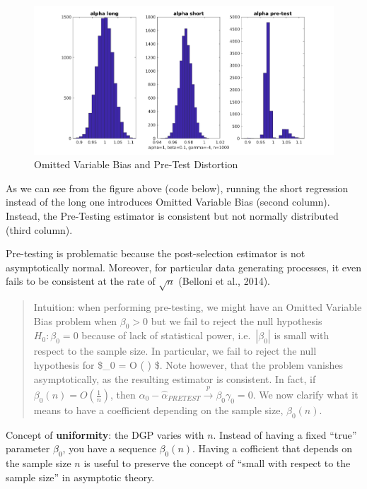 \documentclass[12pt,]{book}
\begin{document}
\begin{figure}
\centering
\includegraphics{figures/Fig_621.png}
\caption{Omitted Variable Bias and Pre-Test Distortion}
\end{figure}

As we can see from the figure above (code below), running the short regression instead of the long one introduces Omitted Variable Bias (second column). Instead, the Pre-Testing estimator is consistent but not normally distributed (third column).

Pre-testing is problematic because the post-selection estimator is not asymptotically normal. Moreover, for particular data generating processes, it even fails to be consistent at the rate of \(\sqrt{n}\) (Belloni et al., 2014).

\begin{quote}
Intuition: when performing pre-testing, we might have an Omitted Variable Bias problem when \(\beta_0>0\) but we fail to reject the null hypothesis \(H_0 : \beta_0 = 0\) because of lack of statistical power, i.e.~\(|\beta_0|\) is small with respect to the sample size. In particular, we fail to reject the null hypothesis for \$\beta\_0 = O \left( \right) \$. Note however, that the problem vanishes asymptotically, as the resulting estimator is consistent. In fact, if \(\beta_0(n) = O\left( \frac{1}{n}\right)\), then \(\alpha_0 - \hat \alpha_{PRETEST} \overset{p}{\to} \beta_0 \gamma_0 = 0\). We now clarify what it means to have a coefficient depending on the sample size, \(\beta_0(n)\).
\end{quote}

Concept of \textbf{uniformity}: the DGP varies with \(n\). Instead of having a fixed ``true'' parameter \(\beta_0\), you have a sequence \(\beta_0(n)\).
Having a cofficient that depends on the sample size \(n\) is useful to preserve the concept of ``small with respect to the sample size'' in asymptotic theory.
\end{document}
